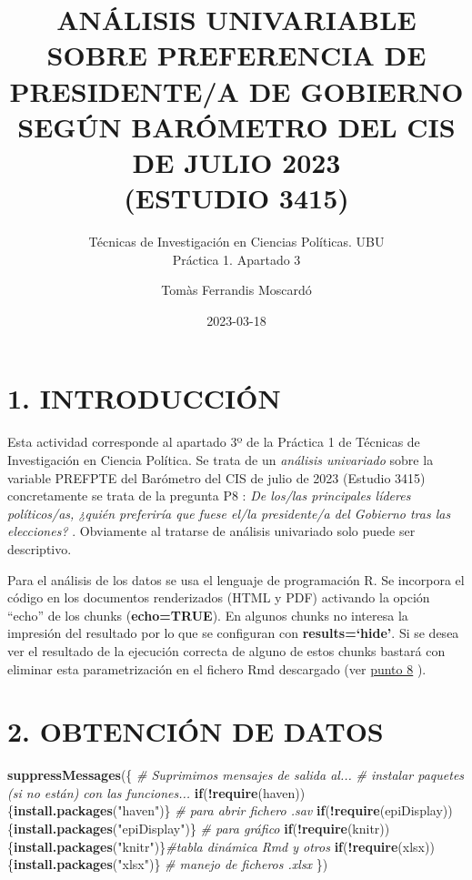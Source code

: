 \documentclass[
  12 pt,
  a4paper,
]{article}
\title{ANÁLISIS UNIVARIABLE SOBRE PREFERENCIA DE PRESIDENTE/A DE
GOBIERNO SEGÚN BARÓMETRO DEL CIS DE JULIO 2023\\
(ESTUDIO 3415)}
\subtitle{Técnicas de Investigación en Ciencias Políticas. UBU\\
Práctica 1. Apartado 3}
\author{Tomàs Ferrandis Moscardó}
\date{2023-03-18}
\newenvironment{Shaded}{\begin{snugshade}}{\end{snugshade}}
\newcommand{\CommentTok}[1]{\textcolor[rgb]{0.56,0.35,0.01}{\textit{#1}}}
\newcommand{\ControlFlowTok}[1]{\textcolor[rgb]{0.13,0.29,0.53}{\textbf{#1}}}
\newcommand{\FunctionTok}[1]{\textcolor[rgb]{0.13,0.29,0.53}{\textbf{#1}}}
\newcommand{\NormalTok}[1]{#1}
\newcommand{\SpecialCharTok}[1]{\textcolor[rgb]{0.81,0.36,0.00}{\textbf{#1}}}
\newcommand{\StringTok}[1]{\textcolor[rgb]{0.31,0.60,0.02}{#1}}
\begin{document}
\maketitle

{
\setcounter{tocdepth}{2}
\tableofcontents
}
\newpage
\renewcommand\tablename{Tabla}

\hypertarget{introducciuxf3n}{%
\section{1. INTRODUCCIÓN}\label{introducciuxf3n}}

Esta actividad corresponde al apartado 3º de la Práctica 1 de Técnicas
de Investigación en Ciencia Política. Se trata de un \emph{análisis
univariado} sobre la variable PREFPTE del Barómetro del CIS de julio de
2023 (Estudio 3415) concretamente se trata de la pregunta P8 : \emph{De
los/las principales líderes políticos/as, ¿quién preferiría que fuese
el/la presidente/a del Gobierno tras las elecciones?} . Obviamente al
tratarse de análisis univariado solo puede ser descriptivo.

Para el análisis de los datos se usa el lenguaje de programación R. Se
incorpora el código en los documentos renderizados (HTML y PDF)
activando la opción ``echo'' de los chunks (\textbf{echo=TRUE}). En
algunos chunks no interesa la impresión del resultado por lo que se
configuran con \textbf{results=`hide'}. Si se desea ver el resultado de
la ejecución correcta de alguno de estos chunks bastará con eliminar
esta parametrización en el fichero Rmd descargado (ver
\protect\hyperlink{id-github}{punto 8} ).

\hypertarget{obtenciuxf3n-de-datos}{%
\section{2. OBTENCIÓN DE DATOS}\label{obtenciuxf3n-de-datos}}

\begin{Shaded}
\begin{Highlighting}[]
\FunctionTok{suppressMessages}\NormalTok{(\{ }\CommentTok{\# Suprimimos mensajes de salida al...}
\CommentTok{\# instalar paquetes (si no están) con las funciones...}
\ControlFlowTok{if}\NormalTok{(}\SpecialCharTok{!}\FunctionTok{require}\NormalTok{(haven))\{}\FunctionTok{install.packages}\NormalTok{(}\StringTok{"haven"}\NormalTok{)\} }\CommentTok{\# para abrir fichero .sav}
\ControlFlowTok{if}\NormalTok{(}\SpecialCharTok{!}\FunctionTok{require}\NormalTok{(epiDisplay))\{}\FunctionTok{install.packages}\NormalTok{(}\StringTok{"epiDisplay"}\NormalTok{)\} }\CommentTok{\# para gráfico }
\ControlFlowTok{if}\NormalTok{(}\SpecialCharTok{!}\FunctionTok{require}\NormalTok{(knitr))\{}\FunctionTok{install.packages}\NormalTok{(}\StringTok{"knitr"}\NormalTok{)\}}\CommentTok{\#tabla dinámica Rmd y otros}
\ControlFlowTok{if}\NormalTok{(}\SpecialCharTok{!}\FunctionTok{require}\NormalTok{(xlsx))\{}\FunctionTok{install.packages}\NormalTok{(}\StringTok{"xlsx"}\NormalTok{)\} }\CommentTok{\# manejo de ficheros .xlsx}
\NormalTok{\})}
\end{Highlighting}
\end{Shaded}
\end{document}
